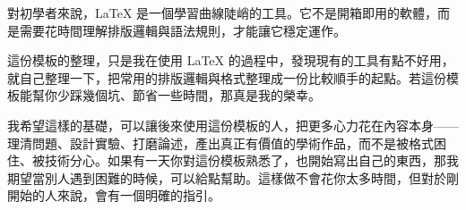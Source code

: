 \newpage
\enHeader{\ackTitle}
\normalsize

對初學者來說，\LaTeX{} 是一個學習曲線陡峭的工具。它不是開箱即用的軟體，而是需要花時間理解排版邏輯與語法規則，才能讓它穩定運作。

這份模板的整理，只是我在使用 \LaTeX{} 的過程中，發現現有的工具有點不好用，就自己整理一下，把常用的排版邏輯與格式整理成一份比較順手的起點。若這份模板能幫你少踩幾個坑、節省一些時間，那真是我的榮幸。

我希望這樣的基礎，可以讓後來使用這份模板的人，把更多心力花在內容本身——理清問題、設計實驗、打磨論述，產出真正有價值的學術作品，而不是被格式困住、被技術分心。如果有一天你對這份模板熟悉了，也開始寫出自己的東西，那我期望當別人遇到困難的時候，可以給點幫助。這樣做不會花你太多時間，但對於剛開始的人來說，會有一個明確的指引。

